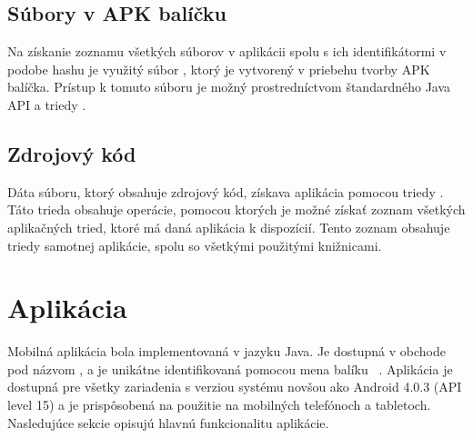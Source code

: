 \subsection{Súbory v APK balíčku}
Na získanie zoznamu všetkých súborov v aplikácii spolu s ich identifikátormi v podobe hashu je využitý súbor , ktorý je vytvorený v priebehu tvorby APK balíčka.  Prístup k tomuto súboru je možný prostredníctvom štandardného Java API a triedy .

\subsection{Zdrojový kód}
Dáta  súboru, ktorý obsahuje zdrojový kód, získava aplikácia pomocou triedy . Táto trieda obsahuje operácie, pomocou ktorých je možné získať zoznam všetkých aplikačných tried, ktoré má daná aplikácia k dispozícií. Tento zoznam obsahuje triedy samotnej aplikácie, spolu so všetkými použitými knižnicami. 

\section{Aplikácia}
Mobilná aplikácia bola implementovaná v jazyku Java. Je dostupná v obchode  pod názvom , a je unikátne identifikovaná pomocou mena balíku ~\cite{gp}. Aplikácia je dostupná pre všetky zariadenia s verziou systému novšou ako Android 4.0.3 (API level 15) a  je prispôsobená na použitie na mobilných telefónoch a tabletoch. Nasledujúce sekcie opisujú hlavnú funkcionalitu aplikácie.



